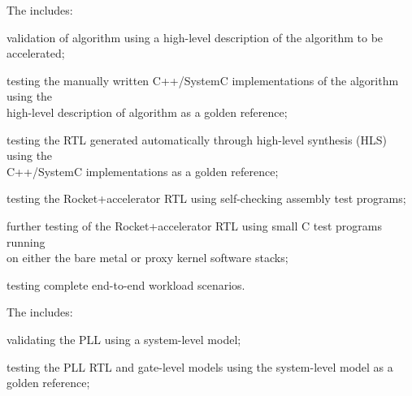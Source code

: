 \begin{cbxlist}{1.5em}{1em}{1em}
\begin{cbxlist}[--]{1.5em}{0em}{0em}
    \end{cbxlist}

 \item The  includes:

    \smallskip
    \begin{cbxlist}[--]{1.5em}{0em}{0em}
      \raggedright

      \item validation of algorithm using a high-level description of the
         algorithm to be accelerated;

      \item testing the manually written C++/SystemC implementations of
         the algorithm using the \\\hspace{0.5em}high-level description
         of algorithm as a golden reference;

      \item testing the RTL generated automatically through high-level
         synthesis (HLS) using the \\\hspace{0.5em}C++/SystemC
         implementations as a golden reference;

      \item testing the Rocket+accelerator RTL using self-checking
         assembly test programs;

      \item further testing of the Rocket+accelerator RTL using small C
         test programs running \\\hspace{0.5em}on either the bare metal
         or proxy kernel software stacks;

      \item testing complete end-to-end workload scenarios.

    \end{cbxlist}

 \item The  includes:

    \smallskip
    \begin{cbxlist}[--]{1.5em}{0em}{0em}
      \raggedright

      \item validating the PLL using a system-level model;

      \item testing the PLL RTL and gate-level models using the
         system-level model as a golden reference;


\end{cbxlist}
\end{cbxlist}
